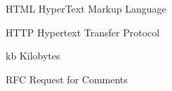 %
%

\begin{siglas}
    \item[HTML] HyperText Markup Language
    \item[HTTP] Hypertext Transfer Protocol
    \item[kb] Kilobytes
    \item[RFC] Request for Comments
\end{siglas}
